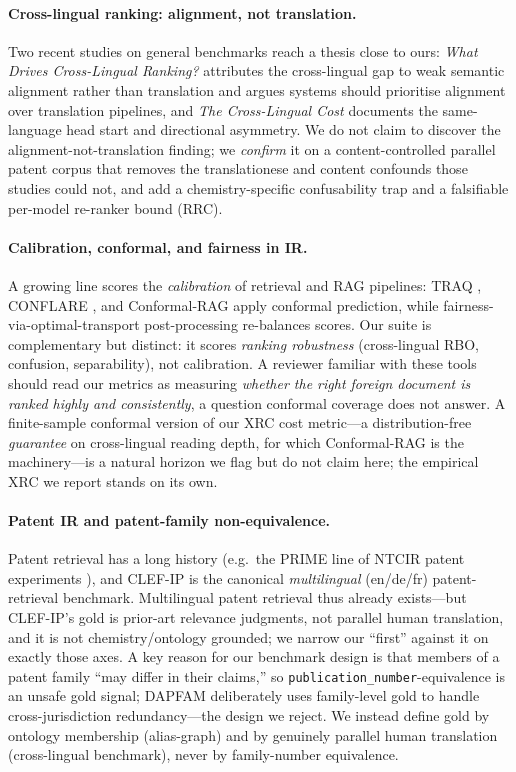 \documentclass[11pt]{article}
\begin{document}
\paragraph{Cross-lingual ranking: alignment, not translation.}
Two recent studies on general benchmarks reach a thesis close to ours:
\emph{What Drives Cross-Lingual Ranking?} \citep{whatdrivesclir2025} attributes
the cross-lingual gap to weak semantic alignment rather than translation and
argues systems should prioritise alignment over translation pipelines, and
\emph{The Cross-Lingual Cost} \citep{crosslingualcost2025} documents the
same-language head start and directional asymmetry. We do not claim to discover
the alignment-not-translation finding; we \emph{confirm} it on a
content-controlled parallel patent corpus that removes the translationese and
content confounds those studies could not, and add a chemistry-specific
confusability trap and a falsifiable per-model re-ranker bound (RRC).

\paragraph{Calibration, conformal, and fairness in IR.}
A growing line scores the \emph{calibration} of retrieval and RAG pipelines:
TRAQ \citep{traq2023}, CONFLARE \citep{conflare2024}, and Conformal-RAG
\citep{conformalrag2025} apply conformal prediction, while
fairness-via-optimal-transport post-processing
\citep{fairnessot2023,buyl2022optimal} re-balances scores. Our suite is
complementary but distinct: it scores \emph{ranking robustness} (cross-lingual
RBO, confusion, separability), not calibration. A reviewer familiar with these
tools should read our metrics as measuring \emph{whether the right foreign
document is ranked highly and consistently}, a question conformal coverage does
not answer. A finite-sample conformal version of our XRC cost metric---a
distribution-free \emph{guarantee} on cross-lingual reading depth, for which
Conformal-RAG \citep{conformalrag2025} is the machinery---is a natural horizon
we flag but do not claim here; the empirical XRC we report stands on its own.

\paragraph{Patent IR and patent-family non-equivalence.}
Patent retrieval has a long history (e.g.\ the PRIME line of NTCIR patent
experiments \citep{prime2002}), and CLEF-IP \citep{clefip2013} is the canonical
\emph{multilingual} (en/de/fr) patent-retrieval benchmark. Multilingual patent
retrieval thus already exists---but CLEF-IP's gold is prior-art relevance
judgments, not parallel human translation, and it is not chemistry/ontology
grounded; we narrow our ``first'' against it on exactly those axes. A key reason
for our benchmark design is that members of a patent family ``may differ in
their claims,'' so \texttt{publication\_number}-equivalence is an unsafe gold
signal; DAPFAM \citep{dapfam2025} deliberately uses family-level gold to handle
cross-jurisdiction redundancy---the design we reject. We instead define gold by
ontology membership (alias-graph) and by genuinely parallel human translation
(cross-lingual benchmark), never by family-number equivalence.
\end{document}
